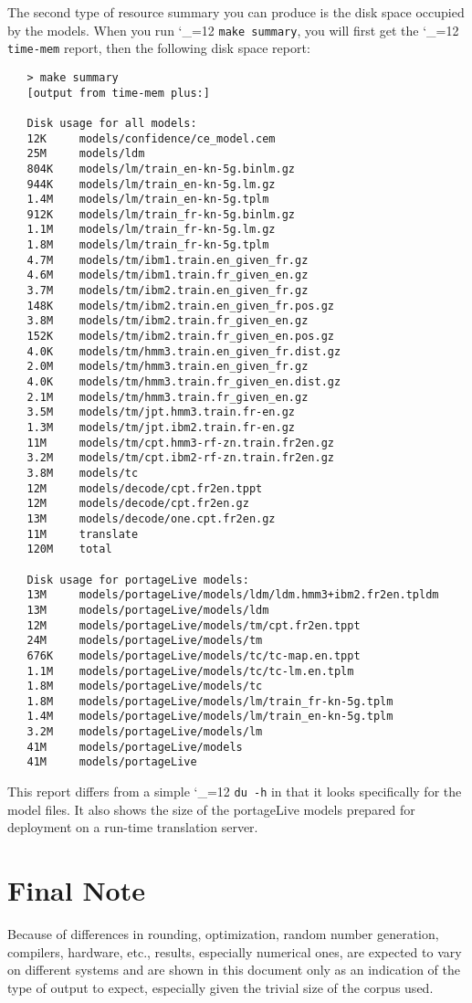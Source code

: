 \documentclass[11pt,letterpaper]{article}
\def\code{\begingroup\catcode`\_=12 \codex}
\newcommand{\codex}[1]{\texttt{#1}\endgroup}
\begin{document}
The second type of resource summary you can produce is the disk space occupied
by the models.  When you run \code{make summary}, you will first get the
\code{time-mem} report, then the following disk space report:
\begin{small}
\begin{verbatim}
   > make summary
   [output from time-mem plus:]
   
   Disk usage for all models:
   12K     models/confidence/ce_model.cem
   25M     models/ldm
   804K    models/lm/train_en-kn-5g.binlm.gz
   944K    models/lm/train_en-kn-5g.lm.gz
   1.4M    models/lm/train_en-kn-5g.tplm
   912K    models/lm/train_fr-kn-5g.binlm.gz
   1.1M    models/lm/train_fr-kn-5g.lm.gz
   1.8M    models/lm/train_fr-kn-5g.tplm
   4.7M    models/tm/ibm1.train.en_given_fr.gz
   4.6M    models/tm/ibm1.train.fr_given_en.gz
   3.7M    models/tm/ibm2.train.en_given_fr.gz
   148K    models/tm/ibm2.train.en_given_fr.pos.gz
   3.8M    models/tm/ibm2.train.fr_given_en.gz
   152K    models/tm/ibm2.train.fr_given_en.pos.gz
   4.0K    models/tm/hmm3.train.en_given_fr.dist.gz
   2.0M    models/tm/hmm3.train.en_given_fr.gz
   4.0K    models/tm/hmm3.train.fr_given_en.dist.gz
   2.1M    models/tm/hmm3.train.fr_given_en.gz
   3.5M    models/tm/jpt.hmm3.train.fr-en.gz
   1.3M    models/tm/jpt.ibm2.train.fr-en.gz
   11M     models/tm/cpt.hmm3-rf-zn.train.fr2en.gz
   3.2M    models/tm/cpt.ibm2-rf-zn.train.fr2en.gz
   3.8M    models/tc
   12M     models/decode/cpt.fr2en.tppt
   12M     models/decode/cpt.fr2en.gz
   13M     models/decode/one.cpt.fr2en.gz
   11M     translate
   120M    total
   
   Disk usage for portageLive models:
   13M     models/portageLive/models/ldm/ldm.hmm3+ibm2.fr2en.tpldm
   13M     models/portageLive/models/ldm
   12M     models/portageLive/models/tm/cpt.fr2en.tppt
   24M     models/portageLive/models/tm
   676K    models/portageLive/models/tc/tc-map.en.tppt
   1.1M    models/portageLive/models/tc/tc-lm.en.tplm
   1.8M    models/portageLive/models/tc
   1.8M    models/portageLive/models/lm/train_fr-kn-5g.tplm
   1.4M    models/portageLive/models/lm/train_en-kn-5g.tplm
   3.2M    models/portageLive/models/lm
   41M     models/portageLive/models
   41M     models/portageLive
\end{verbatim}
\end{small}

This report differs from a simple \code{du -h} in that it looks specifically
for the model files. It also shows the size of the portageLive models prepared 
for deployment on a run-time translation server.

\section{Final Note}
Because of differences in rounding, optimization, random number generation,
compilers, hardware, etc., results, especially numerical ones, are expected to
vary on different systems and are shown in this document only as an indication
of the type of output to expect, especially given the trivial size of the
corpus used.
\end{document}
